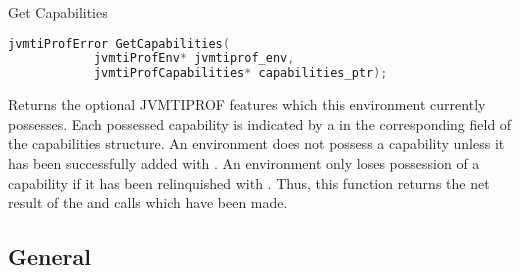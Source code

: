 \begin{apidef}{Get Capabilities}
\begin{lstlisting}[language=C]
jvmtiProfError GetCapabilities(
            jvmtiProfEnv* jvmtiprof_env,
            jvmtiProfCapabilities* capabilities_ptr);
\end{lstlisting}

\begin{apidesc}
Returns the optional JVMTIPROF features which this environment currently possesses. Each possessed capability is indicated by a  in the corresponding field of the capabilities structure. An environment does not possess a capability unless it has been successfully added with . An environment only loses possession of a capability if it has been relinquished with . Thus, this function returns the net result of the  and  calls which have been made. 
\end{apidesc}

\begin{apiphase}
\apiphaseany
\end{apiphase}

\begin{apicap}
\apicaprequired
\end{apicap}

\begin{apiparam}
\end{apiparam}

\apireturnempty

\begin{apierror}
\end{apierror}
\end{apidef}

\subsection{General}

